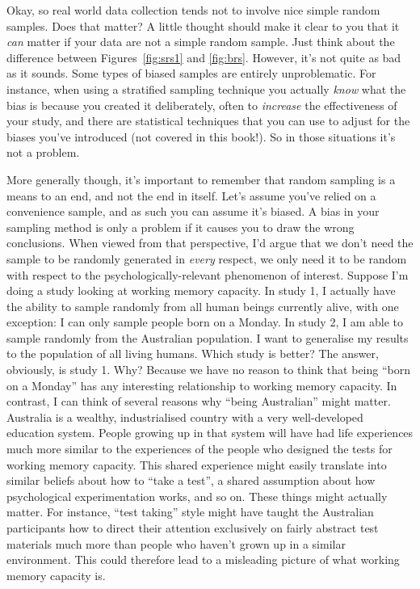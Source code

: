 
Okay, so real world data collection tends not to involve nice simple random samples. Does that matter? A little thought should make it clear to you that it {\it can} matter if your data are not a simple random sample. Just think about the difference between Figures~\ref{fig:srs1} and \ref{fig:brs}. However, it's not quite as bad as it sounds. Some types of biased samples are entirely unproblematic. For instance, when using a stratified sampling technique you actually {\it know} what the bias is because you created it deliberately, often to {\it increase} the effectiveness of your study, and there are statistical techniques that you can use to adjust for the biases you've introduced (not covered in this book!). So in those situations it's not a problem. 

More generally though, it's important to remember that random sampling is a means to an end, and not the end in itself. Let's assume you've relied on a convenience sample, and as such you can assume it's biased. A bias in your sampling method is only a problem if it causes you to draw the wrong conclusions. When viewed from that perspective, I'd argue that we don't need the sample to be randomly generated in {\it every} respect, we only need it to be random with respect to the psychologically-relevant phenomenon of interest. Suppose I'm doing a study looking at working memory capacity. In study 1, I actually have the ability to sample randomly from all human beings currently alive, with one exception: I can only sample people born on a Monday. In study 2, I am able to sample randomly from the Australian population. I want to generalise my results to the population of all living humans. Which study is better? The answer, obviously, is study 1. Why? Because we have no reason to think that being ``born on a Monday'' has any interesting relationship to working memory capacity. In contrast, I can think of several reasons why ``being Australian'' might matter. Australia is a wealthy, industrialised country with a very well-developed education system. People growing up in that system will have had life experiences much more similar to the experiences of the people who designed the tests for working memory capacity. This shared experience might easily translate into similar beliefs about how to ``take a test'', a shared assumption about how psychological experimentation works, and so on. These things might actually matter. For instance, ``test taking'' style might have taught the Australian participants how to direct their attention exclusively on fairly abstract test materials much more than people who haven't grown up in a similar environment. This could therefore lead to a misleading picture of what working memory capacity is. 

